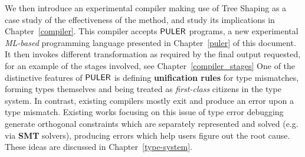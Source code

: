     We then introduce an experimental compiler making use of Tree Shaping as a case study of the effectiveness of the method, and study its implications in Chapter~\ref{compiler}.
    This compiler accepts $\mathsf{PULER}$ programs, a new experimental \textit{ML-based} programming language presented in Chapter~\ref{puler} of this document.
    It then invokes different transformation as required by the final output requested, for an example of the stages involved, see Chapter~\ref{compiler_stages}
    One of the distinctive features of $\mathsf{PULER}$ is defining \textbf{unification rules} for type mismatches, forming types themselves and being treated as \textit{first-class} citizens in the type system.
    In contrast, existing compilers mostly exit and produce an error upon a type mismatch.
    Existing works focusing on this issue of type error debugging \cite{min_type_error} generate orthogonal constraints which are separately represented and solved (e.g. via \textbf{SMT} solvers), producing errors which help users figure out the root cause. These ideas are discussed in Chapter~\ref{type-system}.